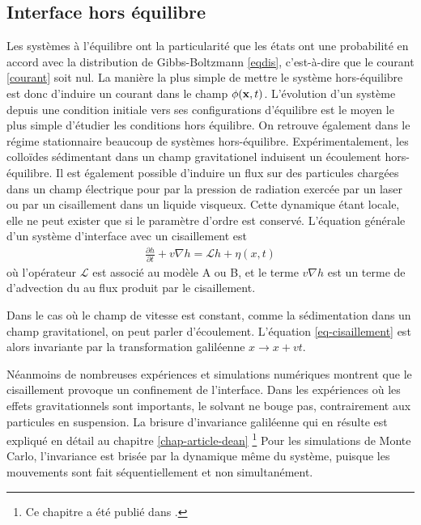     \subsection{Interface hors équilibre}

Les systèmes à l'équilibre ont la particularité que les états ont une probabilité en accord avec la distribution de Gibbs-Boltzmann \ref{eqdis}, c'est-à-dire que le courant \ref{courant} soit nul. La manière la plus simple de mettre le système hors-équilibre est donc d'induire un courant dans le champ $\phi({\bf x},t)$. L'évolution d'un système depuis une condition initiale vers ses configurations d'équilibre est le moyen le plus simple d'étudier les conditions hors équilibre. On retrouve également dans le régime stationnaire beaucoup de systèmes hors-équilibre. Expérimentalement, les colloïdes sédimentant dans un champ gravitationel induisent un écoulement hors-équilibre. Il est également possible d'induire un flux sur des particules chargées dans un champ électrique pour par la pression de radiation exercée par un laser ou par un cisaillement dans un liquide visqueux. Cette dynamique étant locale, elle ne peut exister que si le paramètre d'ordre est conservé. L'équation générale d'un système d'interface avec un cisaillement est\cite{bray_interface_2001-1,bray_interface_2001}
\begin{align}
     \frac{\partial h}{\partial t} + v \nabla h =  \mathcal{L} h +  \eta(x,t)
     \label{eq-cisaillement}
\end{align}
où l'opérateur $\mathcal{L}$ est associé au modèle A ou B, et le terme $v \nabla h$ est un terme de d'advection du au flux produit par le cisaillement. 

Dans le cas où le champ de vitesse est constant, comme la sédimentation dans un champ gravitationel, on peut parler d'écoulement. L'équation \ref{eq-cisaillement} est alors invariante par la transformation galiléenne $x \rightarrow x+vt$. 



Néanmoins de nombreuses expériences\cite{derks_suppression_2006} et simulations numériques \cite{leung_field_1986,rikvold_microstructure_2002,gonnella_nonequilibrium_2009,smith_driven_2010,smith_interfaces_2008,sadhu_non-local_2014,cohen_interface_2016} montrent que le cisaillement provoque un confinement de l'interface. Dans les expériences où les effets gravitationnels sont importants, le solvant ne bouge pas, contrairement aux particules en suspension. La brisure d'invariance galiléenne qui en résulte est expliqué en détail au chapitre \ref{chap-article-dean} \footnote{Ce chapitre a été publié dans \cite{dean_effect_2020}.}
Pour les simulations de Monte Carlo, l'invariance est brisée par la dynamique même du système, puisque les mouvements sont fait séquentiellement et non simultanément.

